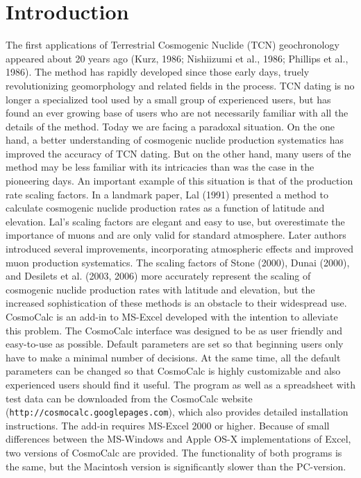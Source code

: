 \documentclass{article}
\begin{document}
\section{Introduction}\label{sec:intro}
The  first  applications   of  Terrestrial  Cosmogenic  Nuclide  (TCN)
geochronology appeared  about 20 years ago (Kurz,  1986; Nishiizumi et
al., 1986; Phillips  et al., 1986).  The method  has rapidly developed
since  those  early  days,  truely revolutionizing  geomorphology  and
related fields in the process.   TCN dating is no longer a specialized
tool used by a small group of experienced users, but has found an ever
growing base  of users who are  not necessarily familiar  with all the
details of the method.  Today we are facing a paradoxal situation.  On
the one hand, a  better understanding of cosmogenic nuclide production
systematics has improved the accuracy  of TCN dating. But on the other
hand,  many  users  of  the  method  may be  less  familiar  with  its
intricacies than  was the case  in the pioneering days.   An important
example  of this  situation is  that  of the  production rate  scaling
factors.   In a  landmark  paper,  Lal (1991)  presented  a method  to
calculate  cosmogenic  nuclide  production  rates  as  a  function  of
latitude and elevation.  Lal's scaling factors are elegant and easy to
use, but overestimate  the importance of muons and  are only valid for
standard atmosphere.   Later authors introduced  several improvements,
incorporating  atmospheric   effects  and  improved   muon  production
systematics.  The  scaling factors of Stone (2000),  Dunai (2000), and
Desilets et al. (2003, 2006)  more accurately represent the scaling of
cosmogenic nuclide  production rates with latitude  and elevation, but
the increased sophistication of these  methods is an obstacle to their
widespread use.
\\

CosmoCalc is  an add-in  to MS-Excel developed  with the  intention to
alleviate this problem.  The CosmoCalc interface was designed to be as
user friendly and easy-to-use as possible.  Default parameters are set
so  that  beginning  users only  have  to  make  a minimal  number  of
decisions. At the same time, all the default parameters can be changed
so that  CosmoCalc is highly  customizable and also  experienced users
should find it useful.  The program as well as a spreadsheet with test
data    can    be    downloaded    from    the    CosmoCalc    website
(\texttt{http://cosmocalc.googlepages.com}),   which   also   provides
detailed installation instructions.  The add-in requires MS-Excel 2000
or  higher. Because of  small differences  between the  MS-Windows and
Apple  OS-X implementations of  Excel, two  versions of  CosmoCalc are
provided.  The  functionality of  both programs is  the same,  but the
Macintosh version is significantly slower than the PC-version.
\\
\end{document}
